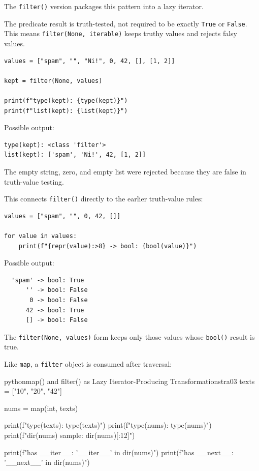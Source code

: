 The \texttt{filter()} version packages this pattern into a lazy iterator.

The predicate result is truth-tested, not required to be exactly \texttt{True} or \texttt{False}. This means \texttt{filter(None, iterable)} keeps truthy values and rejects falsy values.

\begin{verbatim}
values = ["spam", "", "Ni!", 0, 42, [], [1, 2]]

kept = filter(None, values)

print(f"type(kept): {type(kept)}")
print(f"list(kept): {list(kept)}")
\end{verbatim}

Possible output:

\begin{verbatim}
type(kept): <class 'filter'>
list(kept): ['spam', 'Ni!', 42, [1, 2]]
\end{verbatim}

The empty string, zero, and empty list were rejected because they are false in truth-value testing.

This connects \texttt{filter()} directly to the earlier truth-value rules:

\begin{verbatim}
values = ["spam", "", 0, 42, []]

for value in values:
    print(f"{repr(value):>8} -> bool: {bool(value)}")
\end{verbatim}

Possible output:

\begin{verbatim}
  'spam' -> bool: True
      '' -> bool: False
       0 -> bool: False
      42 -> bool: True
      [] -> bool: False
\end{verbatim}

The \texttt{filter(None, values)} form keeps only those values whose \texttt{bool()} result is true.

Like \texttt{map}, a \texttt{filter} object is consumed after traversal:

\begin{codebox}[]{python}{map() and filter() as Lazy Iterator-Producing Transformations}{tra03}
texts = ["10", "20", "42"]

nums = map(int, texts)

print(f"type(texts): {type(texts)}")
print(f"type(nums): {type(nums)}")
print(f"dir(nums) sample: {dir(nums)[:12]}")

print(f"has __iter__: {'__iter__' in dir(nums)}")
print(f"has __next__: {'__next__' in dir(nums)}")
\end{codebox}


